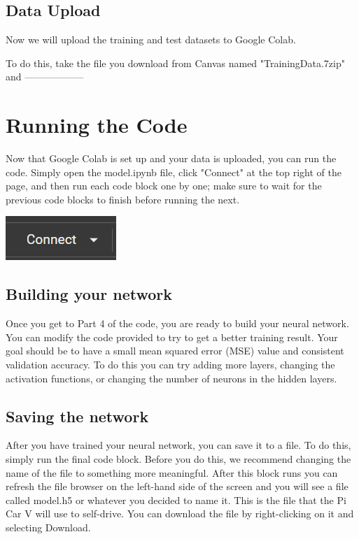 \documentclass[11pt]{report}
\begin{document}
\section{Data Upload}
Now we will upload the training and test datasets to Google Colab. 

To do this, take the file you download from Canvas named "TrainingData.7zip" and ------------------

\chapter{Running the Code}
Now that Google Colab is set up and your data is uploaded, you can run the code. Simply open the model.ipynb file, click "Connect" at the top right of the page, and then run each code block one by one; make sure to wait for the previous code blocks to finish before running the next.

\begin{center}
    \includegraphics[scale=0.4]{connect.png}
\end{center}

\section{Building your network}
Once you get to Part 4 of the code, you are ready to build your neural network. You can modify the code provided to try to get a better training result. Your goal should be to have a small mean squared error (MSE) value and consistent validation accuracy. To do this you can try adding more layers, changing the activation functions, or changing the number of neurons in the hidden layers.

\section{Saving the network}
After you have trained your neural network, you can save it to a file. To do this, simply run the final code block. Before you do this, we recommend changing the name of the file to something more meaningful. After this block runs you can refresh the file browser on the left-hand side of the screen and you will see a file called model.h5 or whatever you decided to name it. This is the file that the Pi Car V will use to self-drive. You can download the file by right-clicking on it and selecting Download. 
\end{document}
